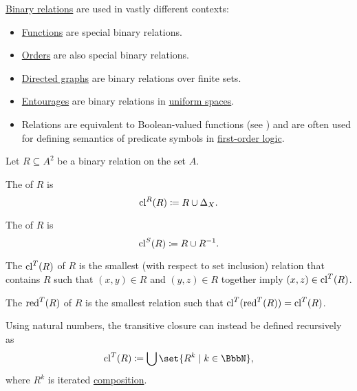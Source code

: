 \begin{example}\label{ex:relation}
  \hyperref[def:binary_relation]{Binary relations} are used in vastly different contexts:
  \begin{itemize}
    \item \hyperref[def:function]{Functions} are special binary relations.
    \item \hyperref[sec:order_theory]{Orders} are also special binary relations.
    \item \hyperref[def:directed_graph]{Directed graphs} are binary relations over finite sets.
    \item \hyperref[def:entourage]{Entourages} are binary relations in \hyperref[def:uniform_space]{uniform spaces}.
    \item Relations are equivalent to Boolean-valued functions (see ) and are often used for defining semantics of predicate symbols in \hyperref[subsec:first_order_logic]{first-order logic}.
  \end{itemize}
\end{example}

\begin{definition}\label{def:derived_relations}
  Let \( R \subseteq A^2 \) be a binary relation on the set \( A \).

  \begin{thmenum}
     The  of \( R \) is
    \begin{equation*}
      \operatorname{cl}^R(R) \coloneqq R \cup \Delta_X.
    \end{equation*}

     The  of \( R \) is
    \begin{equation*}
      \operatorname{cl}^S(R) \coloneqq R \cup R^{-1}.
    \end{equation*}

     The  \( \operatorname{cl}^T(R) \) of \( R \) is the smallest (with respect to set inclusion) relation that contains \( R \) such that \( (x, y) \in R \) and \( (y, z) \in R \) together imply \( (x, z) \in \operatorname{cl}^T(R) \).

    The  \( \operatorname{red}^T(R) \) of \( R \) is the smallest relation such that \( \operatorname{cl}^T(\operatorname{red}^T(R)) = \operatorname{cl}^T(R) \).

    Using natural numbers, the transitive closure can instead be defined recursively as
    \begin{equation*}
      \cl^T(R) \coloneqq \bigcup \set{ R^k \given k \in \BbbN },
    \end{equation*}
    where \( R^k \) is iterated \hyperref[def:binary_relation/composition]{composition}.
  \end{thmenum}
\end{definition}

